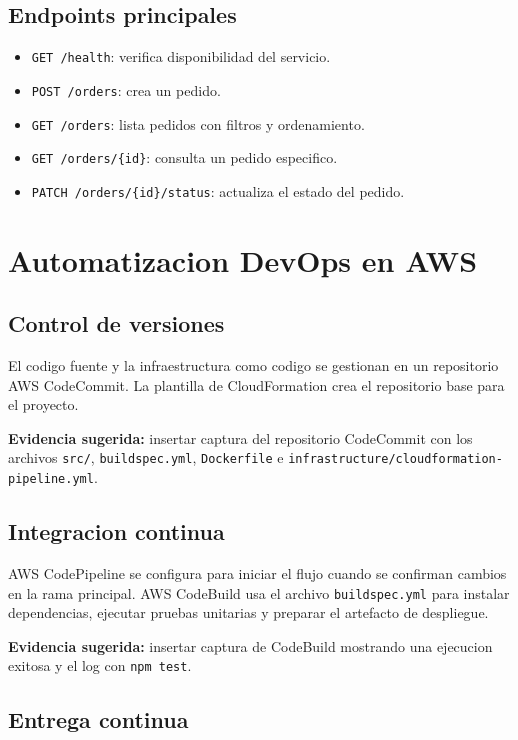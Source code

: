 \documentclass[12pt]{article}
\begin{document}
\subsection{Endpoints principales}

\begin{itemize}
  \item \texttt{GET /health}: verifica disponibilidad del servicio.
  \item \texttt{POST /orders}: crea un pedido.
  \item \texttt{GET /orders}: lista pedidos con filtros y ordenamiento.
  \item \texttt{GET /orders/\{id\}}: consulta un pedido especifico.
  \item \texttt{PATCH /orders/\{id\}/status}: actualiza el estado del pedido.
\end{itemize}

\section{Automatizacion DevOps en AWS}

\subsection{Control de versiones}

El codigo fuente y la infraestructura como codigo se gestionan en un repositorio AWS CodeCommit. La plantilla de CloudFormation crea el repositorio base para el proyecto.

\textbf{Evidencia sugerida:} insertar captura del repositorio CodeCommit con los archivos \texttt{src/}, \texttt{buildspec.yml}, \texttt{Dockerfile} e \texttt{infrastructure/cloudformation-pipeline.yml}.

\subsection{Integracion continua}

AWS CodePipeline se configura para iniciar el flujo cuando se confirman cambios en la rama principal. AWS CodeBuild usa el archivo \texttt{buildspec.yml} para instalar dependencias, ejecutar pruebas unitarias y preparar el artefacto de despliegue.

\textbf{Evidencia sugerida:} insertar captura de CodeBuild mostrando una ejecucion exitosa y el log con \texttt{npm test}.

\subsection{Entrega continua}
\end{document}
